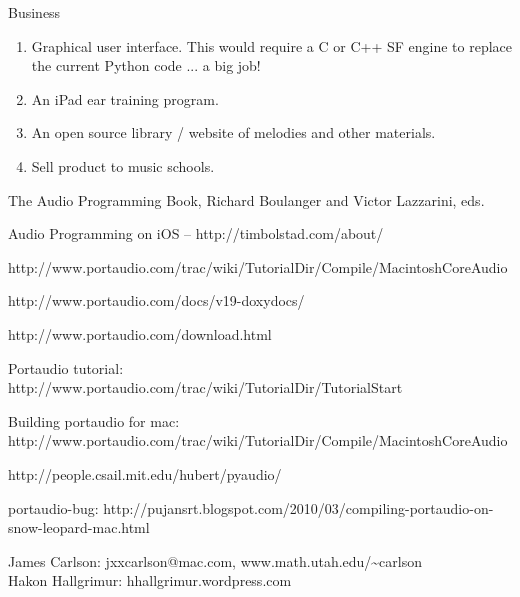 \documentclass[11pt]{amsart}
\begin{document}
Business

\begin{enumerate}
  
  \item Graphical user interface.  This would require a C or C++   SF engine
  to replace the current Python code ... a big job!
  
  \item An iPad ear training program.
  
  \item An open source library  / website of melodies and other materials.
  
  \item Sell product to music schools.
  



\end{enumerate}






\begin{thebibliography}{99}

 The Audio Programming Book, Richard Boulanger and Victor Lazzarini, eds.

 Audio Programming on iOS -- http://timbolstad.com/about/

 http://www.portaudio.com/trac/wiki/TutorialDir/Compile/MacintoshCoreAudio

 http://www.portaudio.com/docs/v19-doxydocs/

 http://www.portaudio.com/download.html

 Portaudio tutorial: http://www.portaudio.com/trac/wiki/TutorialDir/TutorialStart

 Building portaudio for mac: http://www.portaudio.com/trac/wiki/TutorialDir/Compile/MacintoshCoreAudio

 http://people.csail.mit.edu/hubert/pyaudio/

\bibitem portaudio-bug: http://pujansrt.blogspot.com/2010/03/compiling-portaudio-on-snow-leopard-mac.html


\end{thebibliography}

James Carlson: jxxcarlson@mac.com, www.math.utah.edu/\~{}carlson \\
Hakon Hallgrimur: hhallgrimur.wordpress.com
\end{document}
